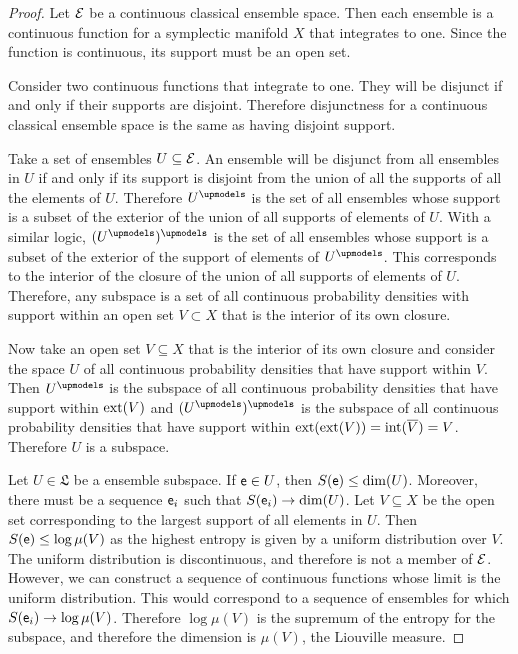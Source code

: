 \begin{proof}
	Let $\mathcal{E}$ be a continuous classical ensemble space. Then each ensemble is a continuous function for a symplectic manifold $X$ that integrates to one. Since the function is continuous, its support must be an open set.
	
	Consider two continuous functions that integrate to one. They will be disjunct if and only if their supports are disjoint. Therefore disjunctness for a continuous classical ensemble space is the same as having disjoint support.
	
	Take a set of ensembles $U \subseteq \mathcal{E}$. An ensemble will be disjunct from all ensembles in $U$ if and only if its support is disjoint from the union of all the supports of all the elements of $U$. Therefore $U^\disjunct$ is the set of all ensembles whose support is a subset of the exterior of the union of all supports of elements of $U$. With a similar logic, $(U^\disjunct)^\disjunct$ is the set of all ensembles whose support is a subset of the exterior of the support of elements of $U^\disjunct$. This corresponds to the interior of the closure of the union  of all supports of elements of $U$. Therefore, any subspace is a set of all continuous probability densities with support within an open set $V \subset X$ that is the interior of its own closure.
	
	Now take an open set $V \subseteq X$ that is the interior of its own closure and consider the space $U$ of all continuous probability densities that have support within $V$. Then $U^\disjunct$ is the subspace of all continuous probability densities that have support within $\operatorname{ext}(V)$ and $(U^\disjunct)^\disjunct$ is the subspace of all continuous probability densities that have support within $\operatorname{ext}(\operatorname{ext}(V)) = \operatorname{int}(\overline{V}) = V$. Therefore $U$ is a subspace.
	
	Let $U \in \mathfrak{L}$ be a ensemble subspace. If $\mathsf{e} \in U$, then $S(\mathsf{e}) \leq \dim(U)$. Moreover, there must be a sequence $\mathsf{e}_i$ such that $S(\mathsf{e}_i) \to \dim(U)$. Let $V \subseteq X$ be the open set corresponding to the largest support of all elements in $U$. Then $S(\mathsf{e}) \leq \log \mu(V)$ as the highest entropy is given by a uniform distribution over $V$. The uniform distribution is discontinuous, and therefore is not a member of $\mathcal{E}$. However, we can construct a sequence of continuous functions whose limit is the uniform distribution. This would correspond to a sequence of ensembles for which $S(\mathsf{e}_i) \to \log \mu(V)$. Therefore $\log \mu(V)$ is the supremum of the entropy for the subspace, and therefore the dimension is $\mu(V)$, the Liouville measure.
\end{proof}

